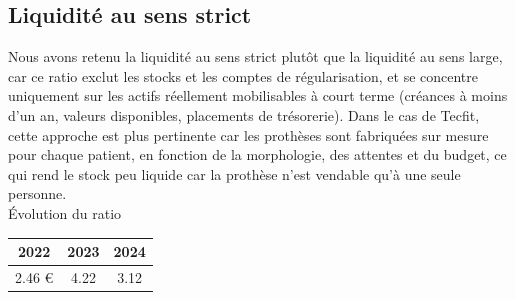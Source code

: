 \subsection{Liquidité au sens strict}
Nous avons retenu la liquidité au sens strict plutôt que la liquidité au sens large, car ce ratio exclut les stocks et les comptes de régularisation, et se concentre uniquement sur les actifs réellement mobilisables à court terme (créances à moins d’un an, valeurs disponibles, placements de trésorerie). Dans le cas de Tecfit, cette approche est plus pertinente car les prothèses sont fabriquées sur mesure pour chaque patient, en fonction de la morphologie, des attentes et du budget, ce qui rend le stock peu liquide car la prothèse n’est vendable qu’à une seule personne.\\
Évolution du ratio\\
\begin{table}[h]
\centering
\begin{tabular}{c|c|c}
\textbf{2022} & \textbf{2023} & \textbf{2024} \\
\hline
2.46 € & 4.22 & 3.12 \\
\end{tabular}
\end{table}

